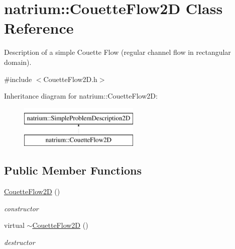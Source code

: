 \hypertarget{classnatrium_1_1CouetteFlow2D}{\section{natrium\-:\-:\-Couette\-Flow2\-D \-Class \-Reference}
\label{classnatrium_1_1CouetteFlow2D}
}


\-Description of a simple \-Couette \-Flow (regular channel flow in rectangular domain).  




{\ttfamily \#include $<$\-Couette\-Flow2\-D.\-h$>$}

\-Inheritance diagram for natrium\-:\-:\-Couette\-Flow2\-D\-:\begin{figure}[H]
\begin{center}
\leavevmode
\includegraphics[height=2.000000cm]{classnatrium_1_1CouetteFlow2D}
\end{center}
\end{figure}
\subsection*{\-Public \-Member \-Functions}
\begin{DoxyCompactItemize}
\item 
\hypertarget{classnatrium_1_1CouetteFlow2D_a95728827df4adef4fdacc31f4d209009}{\hyperlink{classnatrium_1_1CouetteFlow2D_a95728827df4adef4fdacc31f4d209009}{\-Couette\-Flow2\-D} ()}\label{classnatrium_1_1CouetteFlow2D_a95728827df4adef4fdacc31f4d209009}

\begin{DoxyCompactList}\small\item\em constructor \end{DoxyCompactList}\item 
\hypertarget{classnatrium_1_1CouetteFlow2D_a97b61b0f71dc653427ba3db46e185873}{virtual \hyperlink{classnatrium_1_1CouetteFlow2D_a97b61b0f71dc653427ba3db46e185873}{$\sim$\-Couette\-Flow2\-D} ()}\label{classnatrium_1_1CouetteFlow2D_a97b61b0f71dc653427ba3db46e185873}

\begin{DoxyCompactList}\small\item\em destructor \end{DoxyCompactList}\end{DoxyCompactItemize}



